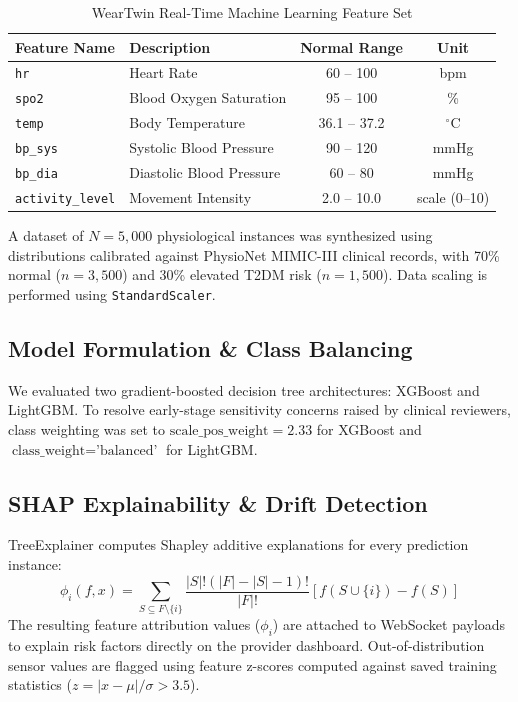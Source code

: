 \documentclass[conference]{IEEEtran}
\begin{document}
\begin{table}[htbp]
\caption{WearTwin Real-Time Machine Learning Feature Set}
\label{tab:features}
\begin{center}
\begin{tabular}{|l|l|c|c|}
\hline
\textbf{Feature Name} & \textbf{Description} & \textbf{Normal Range} & \textbf{Unit} \\
\hline
\texttt{hr} & Heart Rate & 60 -- 100 & bpm \\
\texttt{spo2} & Blood Oxygen Saturation & 95 -- 100 & \% \\
\texttt{temp} & Body Temperature & 36.1 -- 37.2 & $^\circ\text{C}$ \\
\texttt{bp\_sys} & Systolic Blood Pressure & 90 -- 120 & mmHg \\
\texttt{bp\_dia} & Diastolic Blood Pressure & 60 -- 80 & mmHg \\
\texttt{activity\_level} & Movement Intensity & 2.0 -- 10.0 & scale (0--10) \\
\hline
\end{tabular}
\end{center}
\end{table}

A dataset of $N=5{,}000$ physiological instances was synthesized using distributions calibrated against PhysioNet MIMIC-III clinical records, with 70\% normal ($n=3{,}500$) and 30\% elevated T2DM risk ($n=1{,}500$). Data scaling is performed using \texttt{StandardScaler}.

\subsection{Model Formulation \& Class Balancing}
We evaluated two gradient-boosted decision tree architectures: XGBoost and LightGBM. To resolve early-stage sensitivity concerns raised by clinical reviewers, class weighting was set to $\text{scale\_pos\_weight} = 2.33$ for XGBoost and $\text{class\_weight}=\text{'balanced'}$ for LightGBM.

\subsection{SHAP Explainability \& Drift Detection}
TreeExplainer computes Shapley additive explanations for every prediction instance:
\begin{equation}
\phi_i(f, x) = \sum_{S \subseteq F \setminus \{i\}} \frac{|S|!(|F| - |S| - 1)!}{|F|!} \left[ f(S \cup \{i\}) - f(S) \right]
\end{equation}
The resulting feature attribution values ($\phi_i$) are attached to WebSocket payloads to explain risk factors directly on the provider dashboard. Out-of-distribution sensor values are flagged using feature z-scores computed against saved training statistics ($z = |x - \mu| / \sigma > 3.5$).
\end{document}
